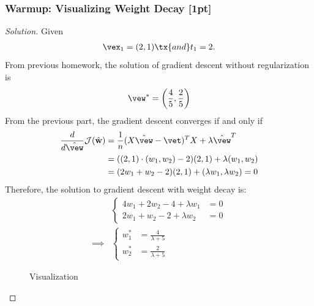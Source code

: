 \documentclass{article}
\begin{document}
	\subsubsection{Warmup: Visualizing Weight Decay [1pt]}
	\begin{proof}[Solution]
		Given 
		\begin{align}
			\vex_1 = (2, 1)\tx{ and } t_1 = 2.
		\end{align}
		From previous homework, the solution of gradient descent without regularization is
		\begin{align}
			\vew^* = \left(\frac{4}{5}, \frac{2}{5} \right)
		\end{align}
		From the previous part, the gradient descent converges if and only if
		\begin{align}
			\frac{d}{d\hat{\vew}} \mathcal{J}(\hat{\mathbf{w}})
			&= \frac{1}{n} (X \hat{\vew} - \vet)^T X + \lambda \hat{\vew}^T \\
			&= ((2,1)\cdot (w_1, w_2) - 2) (2, 1) + \lambda (w_1, w_2) \\
			&= (2 w_1 + w_2 - 2) (2, 1) + (\lambda w_1, \lambda w_2) = 0 \\
		\end{align}
		Therefore, the solution to gradient descent with weight decay is:
		\begin{align}
			&\begin{cases}
				4 w_1 + 2 w_2 -4 + \lambda w_1 &= 0 \\
				2 w_1 + w_2 - 2 + \lambda w_2 &= 0
			\end{cases} \\
			\implies &\begin{cases}
				w_1^* &= \frac{4}{\lambda +5} \\
				w_2^* &= \frac{2}{\lambda +5}
			\end{cases}
		\end{align}
		\begin{figure}[H]
			\centering
			\small
			\caption{Visualization}

\end{figure}
\end{proof}
\end{document}
